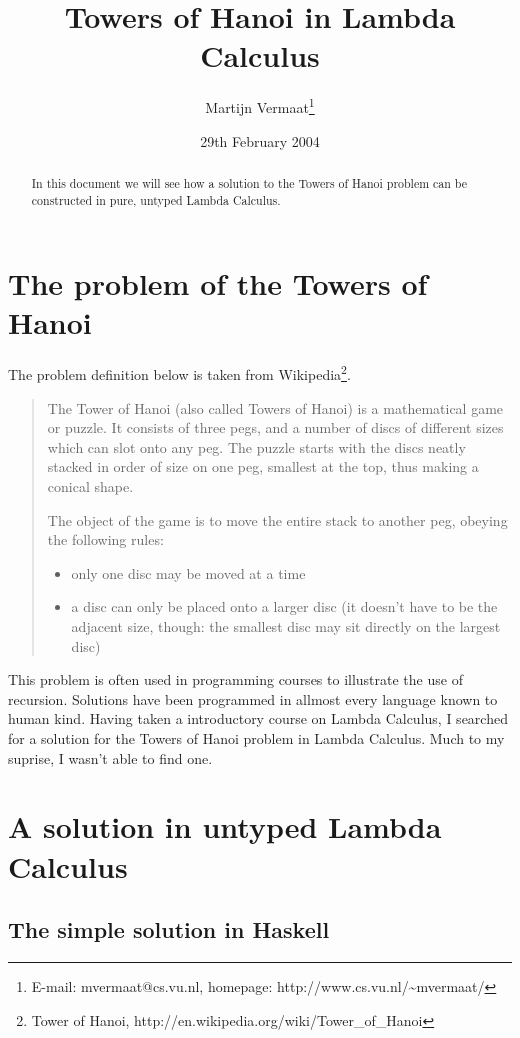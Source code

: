 \documentclass[11pt]{article}
\title{Towers of Hanoi in Lambda Calculus}
\author{
	Martijn Vermaat\footnote{E-mail: mvermaat@cs.vu.nl, homepage: http://www.cs.vu.nl/\~{}mvermaat/}
}
\date{29th February 2004}
\begin{document}
\maketitle

\begin{abstract}
In this document we will see how a solution to the Towers of Hanoi problem can be constructed in pure, untyped Lambda Calculus.
\end{abstract}

\tableofcontents

\section{The problem of the Towers of Hanoi}

The problem definition below is taken from Wikipedia\footnote{Tower of Hanoi, http://en.wikipedia.org/wiki/Tower\_{}of\_{}Hanoi}.

\begin{quote}
The Tower of Hanoi (also called Towers of Hanoi) is a mathematical game or puzzle. It consists of three pegs, and a number of discs of different sizes which can slot onto any peg. The puzzle starts with the discs neatly stacked in order of size on one peg, smallest at the top, thus making a conical shape.

The object of the game is to move the entire stack to another peg, obeying the following rules:
\begin{itemize}
\item
only one disc may be moved at a time
\item
a disc can only be placed onto a larger disc (it doesn't have to be the adjacent size, though: the smallest disc may sit directly on the largest disc) 
\end{itemize}
\end{quote}

This problem is often used in programming courses to illustrate the use of recursion. Solutions have been programmed in allmost every language known to human kind. Having taken a introductory course on Lambda Calculus, I searched for a solution for the Towers of Hanoi problem in Lambda Calculus. Much to my suprise, I wasn't able to find one.


\section{A solution in untyped Lambda Calculus}


\subsection{The simple solution in Haskell}
\end{document}
